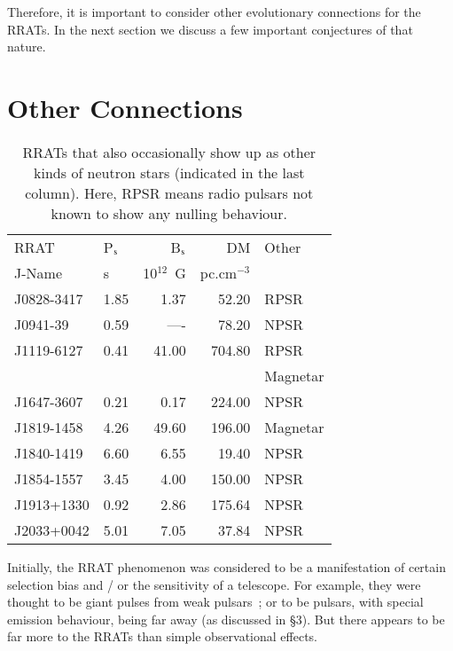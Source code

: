 \documentclass{jaa}
\begin{document}
Therefore, it is important  to consider other evolutionary connections
for  the RRATs.   In  the  next section  we  discuss  a few  important
conjectures of that nature. 

\section{Other Connections}
%
\begin{table} 
%
\centering
\begin{tabular}{llrrl} \toprule
RRAT       & P$_{\rm s}$ & B$_{\rm s}$  & DM          & Other \\
J-Name     & s         & 10$^{12}$~G & pc.cm$^{-3}$ &      \\ \midrule
J0828-3417 & 1.85      & 1.37       & 52.20       & RPSR \\
J0941-39   & 0.59      & ----       & 78.20       & NPSR \\
J1119-6127 & 0.41      & 41.00      & 704.80      & RPSR \\
           &           &            &             & Magnetar \\
J1647-3607 & 0.21      & 0.17       & 224.00      & NPSR \\
J1819-1458 & 4.26      & 49.60      & 196.00      & Magnetar \\
J1840-1419 & 6.60      & 6.55       & 19.40       & NPSR \\
J1854-1557 & 3.45      & 4.00       & 150.00      & NPSR \\ 
J1913+1330 & 0.92      & 2.86       & 175.64      & NPSR \\ 
J2033+0042 & 5.01      & 7.05       & 37.84       & NPSR \\ \bottomrule
\end{tabular}
%
\caption{RRATs  that  also occasionally  show  up  as other  kinds of
  neutron stars (indicated in the last column). Here, RPSR means radio
  pulsars not known to show any nulling behaviour. }
%  
  \label{t_ORAT}
%  
\end{table}
%

Initially, the RRAT phenomenon was considered to be a manifestation of
certain selection bias  and / or the sensitivity of  a telescope.  For
example,   they  were   thought   to  be   giant   pulses  from   weak
pulsars~\cite{knigh06};  or  to  be  pulsars,  with  special  emission
behaviour, being far away (as discussed  in \S3). But there appears to
be far more to the RRATs than simple observational effects.
\end{document}
